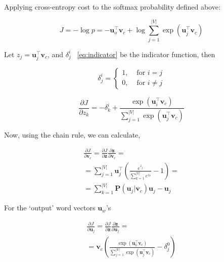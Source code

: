 Applying cross-entropy cost to the softmax probability defined above:

\begin{equation}
J =-\log{p} = - {\boldsymbol u}_{o}^{\top}{\boldsymbol v}_{c} + \log\sum^{\vert{V}\vert}_{j=1}\exp{({\boldsymbol u}_{j}^{\top}{\boldsymbol v}_{c})}
\end{equation}

Let $z_{j}={\boldsymbol u}_{j}^{\top}{\boldsymbol v}_{c}$, and $\delta^{i}_{j}$ ~\ref{eq:indicator} be the indicator function, then

\begin{equation}
\label{eq:indicator}
\delta^{i}_{j} =  
	\begin{cases}
	1, &\text{ for }i=j \\
	0, &\text{ for }i\neq j
	\end{cases}
\end{equation}


\begin{equation}
\frac{\partial J}{\partial{z_{k}}} = - \delta^{i}_{k} + \frac{\exp{({\boldsymbol u}_{i}^{\top}{\boldsymbol v}_{c})}}{\sum^{\vert{V}\vert}_{j=1}\exp{({\boldsymbol u}_{j}^{\top}{\boldsymbol v}_{c})}}
\end{equation}

Now, using the chain rule, we can calculate,

\begin{equation}
	\begin{multlined}
	\frac{\partial J}{\partial{{\boldsymbol v}_{c}}} =  \frac{\partial J}{\partial{{\boldsymbol z}}}\frac{\partial{{\boldsymbol z}}}{\partial{{\boldsymbol v}_{c}}} =\\
	= \sum^{\vert{V}\vert}_{j=1}{\boldsymbol u}_{j}^{\top}\left(\frac{e^{z_{j}}}{\sum^{\vert{V}\vert}_{k=1}e^{z_{k}}} -  1\right) =\\
	= \sum^{\vert{V}\vert}_{k=1}{\boldsymbol P}({\boldsymbol u}_{j} \vert {\boldsymbol v}_{c} ){\boldsymbol u}_{j} - {\boldsymbol u}_{j}
	\end{multlined}
\end{equation}


\noindent For the `output' word vectors ${\boldsymbol u}_{w}$'s

\begin{equation}
	\begin{multlined}
	\frac{\partial J}{\partial{\boldsymbol u}_{j}} = \frac{\partial J}{\partial{{\boldsymbol z}}}\frac{\partial{{\boldsymbol z}}}{\partial{\boldsymbol u}_{j}} =\\
	= {\boldsymbol v}_{c}\left(\frac{\exp{({\boldsymbol u}^{\top}_{0}{\boldsymbol v}_{c})}}{\sum^{\vert{V}\vert}_{j=1}\exp{({\boldsymbol u}^{\top}_{j}{\boldsymbol v}_{c})}} - \delta^{0}_{j}\right)
	\end{multlined}
\end{equation}

